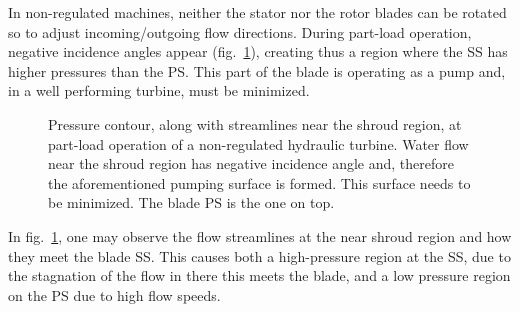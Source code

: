 In non-regulated machines, neither the stator nor the rotor blades can be rotated so to adjust incoming/outgoing flow directions. During part-load operation, negative incidence angles appear (fig.\ \ref{design-pumpS}), creating thus a region where the SS has higher pressures than the PS. This part of the blade is operating as a pump and, in a well performing turbine, must be minimized. 

\begin{figure}[h!]
\begin{minipage}[b]{1\linewidth}
 \centering
\end{minipage}
\caption{Pressure contour, along with streamlines near the shroud region, at part-load operation of a non-regulated hydraulic turbine. Water flow near the shroud region has negative incidence angle and, therefore the aforementioned pumping surface is formed. This surface needs to be minimized. The blade PS is the one on top.}
\label{design-pumpS}
\end{figure}

In fig.\ \ref{design-pumpS}, one may observe the flow streamlines at the near shroud region and how they meet the blade SS. This causes both a high-pressure region at the SS, due to the stagnation of the flow in there this meets the blade,  and a low pressure region on the PS due to high flow speeds.        

